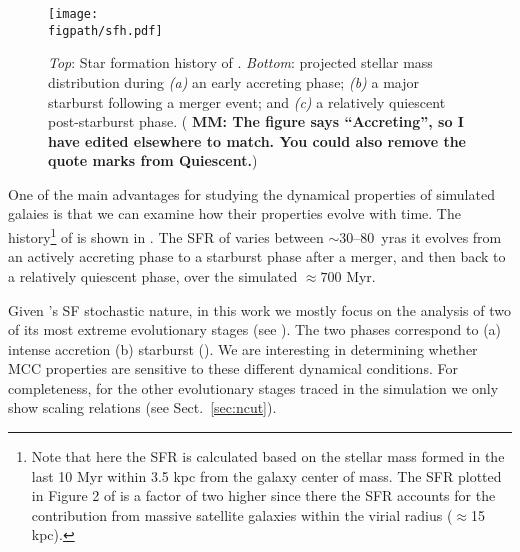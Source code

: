 \IfFileExists{emulateapjlegacy.cls}{\documentclass[iop]{emulateapjlegacy}}{\documentclass[iop]{emulateapj}}
\newcommand{\MM}[1]{({\bf \color{mmcolor} MM: #1})}
\def\figpath{./Fig}
\begin{document}
\begin{figure*}
\centering
\texttt{[image: \\figpath/sfh.pdf]}
\caption{
    {\it Top}: Star formation history of \flower. {\it Bottom}:
    projected stellar mass distribution during {\it (a)} an early
    accreting phase;  {\it (b)} a major starburst following a merger
    event; and {\it (c)} a relatively quiescent post-starburst
    phase. \MM{The figure says ``Accreting'', so I have edited
      elsewhere to match.  You could also remove the quote marks from Quiescent.}
\label{fig:SFH}}
\end{figure*}

One of the main advantages for studying the dynamical properties of simulated galaies is that we can examine how their properties evolve with time.
%
The \SF history\footnote{Note that here the SFR is calculated based on
  the stellar mass formed in the last 10 Myr within 3.5 kpc from the
  galaxy center of mass. The SFR plotted in Figure 2 of
  \citet{Pallottini17b} is a factor of two higher since there the SFR
  accounts for the contribution from massive satellite galaxies within
  the virial radius ($\approx$15\,kpc).} of \flower is shown in
. The SFR of \flower varies between $\sim$30--80 \Msun\,yr\pmOne as it evolves from an actively accreting phase to a starburst phase after a merger, and then back to a relatively quiescent phase, over the simulated $\approx 700$ Myr.

Given \flower's SF stochastic nature, in this work we mostly focus on
the analysis of two of its most extreme evolutionary stages (see
). The two phases correspond to (a) intense accretion
(b) starburst (). We are interesting in determining whether
MCC properties are sensitive to these different dynamical
conditions. For completeness, for the other evolutionary stages traced
in the simulation we only show scaling relations (see 
     Sect.~\ref{sec:ncut}).
\end{document}
